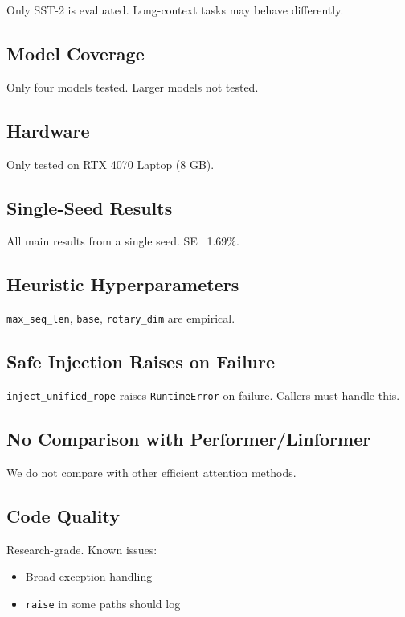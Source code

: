 {Only SST-2 is evaluated. Long-context tasks may behave differently.

\subsection{Model Coverage}

Only four models tested. Larger models not tested.

\subsection{Hardware}

Only tested on RTX 4070 Laptop (8 GB).

\subsection{Single-Seed Results}

All main results from a single seed. SE ~1.69\%.

\subsection{Heuristic Hyperparameters}

\texttt{max\_seq\_len}, \texttt{base}, \texttt{rotary\_dim} are empirical.

\subsection{Safe Injection Raises on Failure}

\texttt{inject\_unified\_rope} raises \texttt{RuntimeError} on failure. Callers must 
handle this.

\subsection{No Comparison with Performer/Linformer}

We do not compare with other efficient attention methods.

\subsection{Code Quality}

Research-grade. Known issues:
\begin{itemize}
\item Broad exception handling
\item \texttt{raise} in some paths should log


\end{itemize}}
